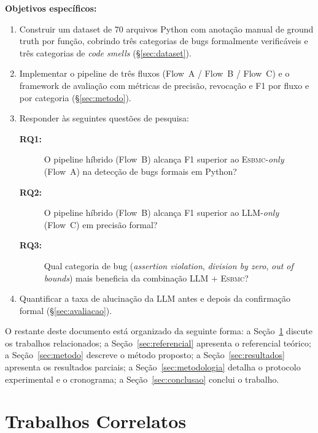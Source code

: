 \documentclass[conference]{IEEEtran}
\newcommand{\esbmc}{\textsc{Esbmc}}
\newcommand{\flowA}{Flow~A}
\newcommand{\flowB}{Flow~B}
\newcommand{\flowC}{Flow~C}
\begin{document}
\textbf{Objetivos específicos:}
\begin{enumerate}
  \item[\textbf{OE1.}] Construir um dataset de 70 arquivos Python com
    anotação manual de ground truth por função, cobrindo três categorias
    de bugs formalmente verificáveis e três categorias de \textit{code
    smells} (\S\ref{sec:dataset}).
  \item[\textbf{OE2.}] Implementar o pipeline de três fluxos
    (Flow~A / Flow~B / Flow~C) e o framework de avaliação com métricas
    de precisão, revocação e F1 por fluxo e por categoria
    (\S\ref{sec:metodo}).
  \item[\textbf{OE3.}] Responder às seguintes questões de pesquisa:
    \begin{description}
      \item[\textbf{RQ1:}] O pipeline híbrido (\flowB{}) alcança F1
        superior ao \esbmc{}-\textit{only} (\flowA{}) na detecção de
        bugs formais em Python?
      \item[\textbf{RQ2:}] O pipeline híbrido (\flowB{}) alcança F1
        superior ao LLM-\textit{only} (\flowC{}) em precisão formal?
      \item[\textbf{RQ3:}] Qual categoria de bug (\textit{assertion
        violation}, \textit{division by zero}, \textit{out of bounds})
        mais beneficia da combinação LLM + \esbmc{}?
    \end{description}
  \item[\textbf{OE4.}] Quantificar a taxa de alucinação da LLM antes
    e depois da confirmação formal (\S\ref{sec:avaliacao}).
\end{enumerate}

O restante deste documento está organizado da seguinte forma:
a Seção~\ref{sec:correlatos} discute os trabalhos relacionados;
a Seção~\ref{sec:referencial} apresenta o referencial teórico;
a Seção~\ref{sec:metodo} descreve o método proposto;
a Seção~\ref{sec:resultados} apresenta os resultados parciais;
a Seção~\ref{sec:metodologia} detalha o protocolo experimental e
o cronograma;
a Seção~\ref{sec:conclusao} conclui o trabalho.

\section{Trabalhos Correlatos}
\label{sec:correlatos}

%
\end{document}
